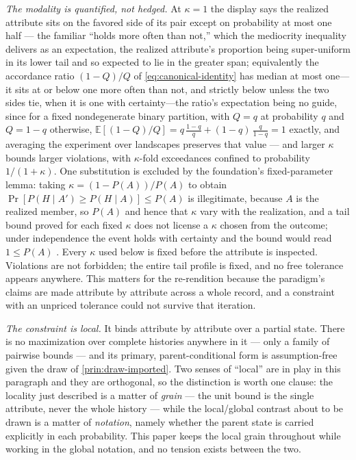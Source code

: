 \documentclass[11pt]{article}
\theoremstyle{definition}
\begin{document}
\emph{The modality is quantified, not hedged.} At $\kappa = 1$ the display says the realized attribute sits on the favored side of its pair except on probability at most one half --- the familiar ``holds more often than not,'' which the mediocrity inequality delivers as an expectation, the realized attribute's proportion being super-uniform in its lower tail and so expected to lie in the greater span; equivalently the accordance ratio $(1-Q)/Q$ of \eqref{eq:canonical-identity} has median at most one---it sits at or below one more often than not, and strictly below unless the two sides tie, when it is one with certainty---the ratio's expectation being no guide, since for a fixed nondegenerate binary partition, with $Q = q$ at probability $q$ and $Q = 1 - q$ otherwise, $\mathbb{E}[(1 - Q)/Q] = q\,\tfrac{1-q}{q} + (1-q)\,\tfrac{q}{1-q} = 1$ exactly, and averaging the experiment over landscapes preserves that value --- and larger $\kappa$ bounds larger violations, with $\kappa$-fold exceedances confined to probability $1/(1+\kappa)$. One substitution is excluded by the foundation's fixed-parameter lemma: taking $\kappa = (1 - P(A))/P(A)$ to obtain $\Pr[P(H \mid A') \ge P(H \mid A)] \le P(A)$ is illegitimate, because $A$ is the realized member, so $P(A)$ and hence that $\kappa$ vary with the realization, and a tail bound proved for each fixed $\kappa$ does not license a $\kappa$ chosen from the outcome; under independence the event holds with certainty and the bound would read $1 \le P(A)$ \cite{Nexus}. Every $\kappa$ used below is fixed before the attribute is inspected. Violations are not forbidden; the entire tail profile is fixed, and no free tolerance appears anywhere. This matters for the re-rendition because the paradigm's claims are made attribute by attribute across a whole record, and a constraint with an unpriced tolerance could not survive that iteration.

\emph{The constraint is local.} It binds attribute by attribute over a partial state. There is no maximization over complete histories anywhere in it --- only a family of pairwise bounds --- and its primary, parent-conditional form is assumption-free given the draw of \autoref{prin:draw-imported}. Two senses of ``local'' are in play in this paragraph and they are orthogonal, so the distinction is worth one clause: the locality just described is a matter of \emph{grain} --- the unit bound is the single attribute, never the whole history --- while the local/global contrast about to be drawn is a matter of \emph{notation}, namely whether the parent state is carried explicitly in each probability. This paper keeps the local grain throughout while working in the global notation, and no tension exists between the two.
\end{document}
